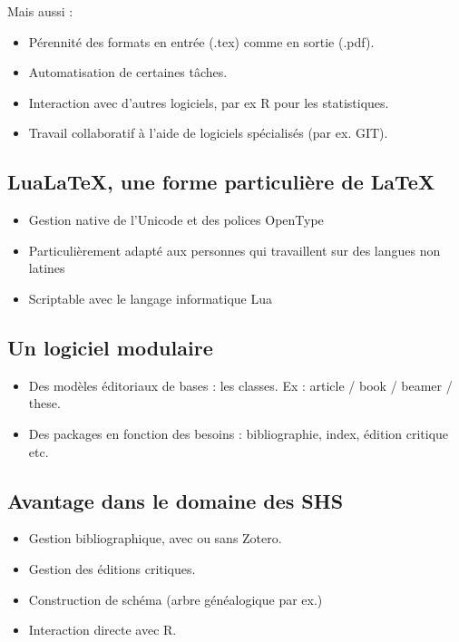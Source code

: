 \begin{slide}
  Mais aussi :
  \begin{itemize}
      \item Pérennité des formats en entrée (.tex) comme en sortie (.pdf).
      \item Automatisation de certaines tâches.
      \item Interaction avec d'autres logiciels, par ex R pour les statistiques.
      \item Travail collaboratif à l'aide de logiciels spécialisés (par ex. GIT).
  \end{itemize}
\end{slide}

\subsection{Lua\LaTeX, une forme particulière de \LaTeX}
\begin{slide}
  \begin{itemize}
    \item Gestion native de l'Unicode et des polices OpenType
    \item Particulièrement adapté aux personnes qui travaillent sur des langues non latines
      \item Scriptable avec le langage informatique Lua
  \end{itemize}
\end{slide}

\subsection{Un logiciel modulaire}

\begin{slide}
  \begin{itemize}
    \item Des modèles éditoriaux de bases : les classes. Ex : article / book / beamer / these.
    \item Des packages en fonction des besoins : bibliographie, index, édition critique etc.
  \end{itemize}
\end{slide}
\subsection{Avantage dans le domaine des SHS}

\begin{slide}
  \begin{itemize}
    \item Gestion bibliographique, avec ou sans  Zotero.
    \item Gestion des éditions critiques.
    \item Construction de schéma (arbre généalogique par ex.)
    \item Interaction directe avec R.
  \end{itemize}
\end{slide}

